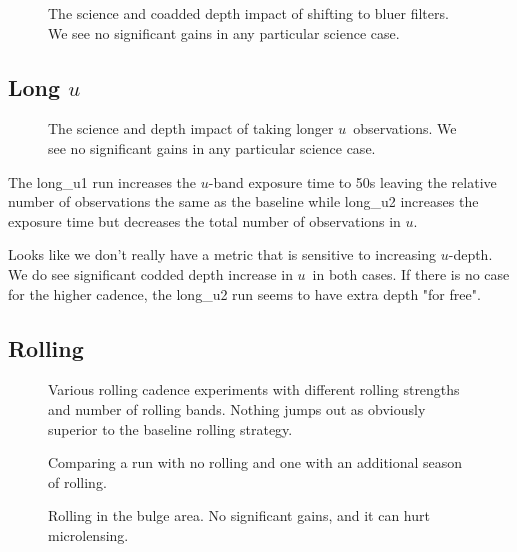 \begin{figure}
\caption{The science and coadded depth impact of shifting to bluer filters. We see no significant gains in any particular science case.\label{fig:bluer_radar}}
\end{figure}

\subsection{Long $u$}

\begin{figure}
\caption{The science and depth impact of taking longer $u$\ observations. We see no significant gains in any particular science case.\label{fig:long_u}}
\end{figure}


The long\_u1 run increases the $u$-band exposure time to 50s leaving the relative number of observations the same as the baseline while long\_u2 increases the exposure time but decreases the total number of observations in $u$. 

Looks like we don't really have a metric that is sensitive to increasing $u$-depth. We do see significant codded depth increase in $u$\ in both cases. If there is no case for the higher cadence, the long\_u2 run seems to have extra depth "for free".


\subsection{Rolling}


\begin{figure}
\caption{Various rolling cadence experiments with different rolling strengths and number of rolling bands. Nothing jumps out as obviously superior to the baseline rolling strategy. \label{fig:rolling}}
\end{figure}


\begin{figure}
\caption{Comparing a run with no rolling and one with an additional season of rolling. \label{fig:rolling_more}}
\end{figure}


\begin{figure}
\caption{Rolling in the bulge area. No significant gains, and it can hurt microlensing. \label{fig:rolling_bulge}}
\end{figure}

